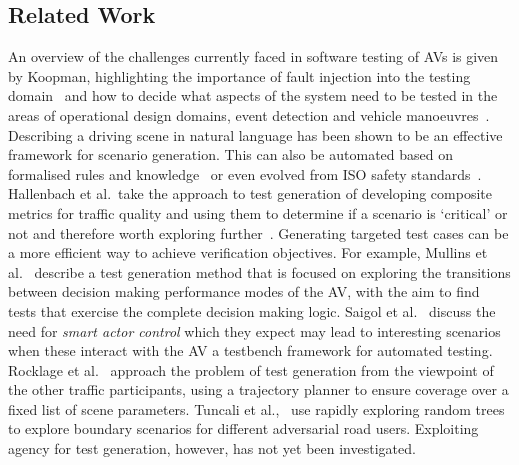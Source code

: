 \documentclass[letterpaper, 10 pt, journal, twoside]{IEEEtran}
\begin{document}
\subsection{Related Work}\label{s:background}

An overview of the challenges currently faced in software testing of AVs is given by Koopman, highlighting the importance of fault injection into the testing domain~\cite{Koopman2016} and how to decide what aspects of the system need to be tested in the areas of operational design domains, event detection and vehicle manoeuvres~\cite{Koopman2019}. 
%
Describing a driving scene in natural language has been shown to be an effective framework for scenario generation. This can also be automated based on formalised rules and knowledge~\cite{Bagschik2018} or even evolved from ISO safety standards~\cite{Menzel2018}. 
%
Hallenbach et al.\ take the approach to test generation of developing composite metrics for traffic quality and using them to determine if a scenario is `critical' or not and therefore worth exploring further~\cite{Hallerbach2018}. 
%
Generating targeted test cases can be a more efficient way to achieve verification objectives. 
%
For example, Mullins et al.~\cite{Mullins2018} describe a test generation method that is focused on exploring the transitions between decision making performance modes of the AV, with the aim to find tests that exercise the complete decision making logic. 
%
Saigol et al.~\cite{Saigol2018} discuss the need for \textit{smart actor control} which they expect may lead to interesting scenarios when these interact with the AV a testbench framework for automated testing. 
%
Rocklage et al.~\cite{Rocklage2017} approach the problem of test generation from the viewpoint of the other traffic participants, using a trajectory planner to ensure coverage over a fixed list of scene parameters. 
%
Tuncali et al.,~\cite{Tuncali2019} use rapidly exploring random trees to explore boundary scenarios for different adversarial road users.
%
Exploiting agency for test generation, however, has not yet been investigated. 

\end{document}
